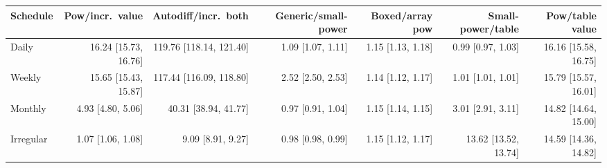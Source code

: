 \begin{tabular}{lrrrrrr}
\toprule
Schedule & Pow/incr.\ value & Autodiff/incr.\ both & Generic/small-power & Boxed/array pow & Small-power/table & Pow/table value \\
\midrule
Daily & 16.24 [15.73, 16.76] & 119.76 [118.14, 121.40] & 1.09 [1.07, 1.11] & 1.15 [1.13, 1.18] & 0.99 [0.97, 1.03] & 16.16 [15.58, 16.75] \\
Weekly & 15.65 [15.43, 15.87] & 117.44 [116.09, 118.80] & 2.52 [2.50, 2.53] & 1.14 [1.12, 1.17] & 1.01 [1.01, 1.01] & 15.79 [15.57, 16.01] \\
Monthly & 4.93 [4.80, 5.06] & 40.31 [38.94, 41.77] & 0.97 [0.91, 1.04] & 1.15 [1.14, 1.15] & 3.01 [2.91, 3.11] & 14.82 [14.64, 15.00] \\
Irregular & 1.07 [1.06, 1.08] & 9.09 [8.91, 9.27] & 0.98 [0.98, 0.99] & 1.15 [1.12, 1.17] & 13.62 [13.52, 13.74] & 14.59 [14.36, 14.82] \\
\bottomrule
\end{tabular}
